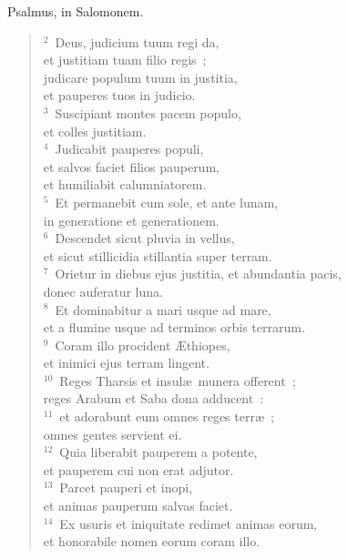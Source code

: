 \bchapter
\lettrine[lines=3,image=true,loversize=0.05,lraise=-0.03]{P}{}salmus, in Salomonem.
\begin{flushleft}\begin{verse}\vspace{6pt}${}^{2}$~Deus, judicium tuum regi da,\\ et justitiam tuam filio regis~;\\ judicare populum tuum in justitia,\\ et pauperes tuos in judicio.\\
${}^{3}$~Suscipiant montes pacem populo,\\ et colles justitiam.\\
${}^{4}$~Judicabit pauperes populi,\\ et salvos faciet filios pauperum,\\ et humiliabit calumniatorem.\\
${}^{5}$~Et permanebit cum sole, et ante lunam,\\ in generatione et generationem.\\
${}^{6}$~Descendet sicut pluvia in vellus,\\ et sicut stillicidia stillantia super terram.\\
${}^{7}$~Orietur in diebus ejus justitia, et abundantia pacis,\\ donec auferatur luna.\\
${}^{8}$~Et dominabitur a mari usque ad mare,\\ et a flumine usque ad terminos orbis terrarum.\\
${}^{9}$~Coram illo procident \AE thiopes,\\ et inimici ejus terram lingent.\\
${}^{10}$~Reges Tharsis et insul\ae\ munera offerent~;\\ reges Arabum et Saba dona adducent~:\\
${}^{11}$~et adorabunt eum omnes reges terr\ae~;\\ omnes gentes servient ei.\\
${}^{12}$~Quia liberabit pauperem a potente,\\ et pauperem cui non erat adjutor.\\
${}^{13}$~Parcet pauperi et inopi,\\ et animas pauperum salvas faciet.\\
${}^{14}$~Ex usuris et iniquitate redimet animas eorum,\\ et honorabile nomen eorum coram illo.\\

\end{verse}
\end{flushleft}
